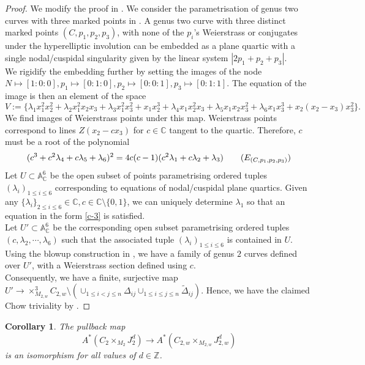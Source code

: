\documentclass[11pt]{amsart}
\newcommand\Z{\mathbb{Z}}
\numberwithin{theorem}{section}
\newtheorem{corollary}{Corollary}[section]
\numberwithin{lemma}{section}
\theoremstyle{definition}
\newcommand{\ri}{\rightarrow}
\newcommand{\K}{\mathbb{C}}
\newcommand{\la}{\lambda}
\begin{document}
\begin{proof}
	We modify the proof in \cite[Lemma 4.8]{shubham-r2}. We consider the parametrisation of genus two curves with three marked points in \cite[\S 2.4]{casnati}.
A genus two curve with three distinct marked points $(C,p_1,p_2,p_3)$, with none of the $p_i$’s Weierstrass or conjugates under the hyperelliptic involution can be embedded as a plane quartic with a single nodal/cuspidal singularity given by the linear system $|2p_1+p_2+p_3|$.\\
We rigidify the embedding further by setting the images of the node $N\mapsto  [1 : 0 : 0],p_1\mapsto [0 : 1 : 0],p_2\mapsto [0 : 0 : 1],p_3 \mapsto [0 : 1 : 1]$. 
The equation of the image is then an element of the space
$$V := \{\la_1x_1^2x_2^2+\la_2x_1^2x_2x_3+\la_3x_1^2x_3^2+x_1x_2^3+\la_4x_1x_2^2x_3+\la_5x_1x_2x_3^2+\la_6x_1x_3^3+ x_2(x_2-x_3)x_3^2\}.$$
 We find images of Weierstrass points under this map. Weierstrass points correspond to lines $Z(x_2-cx_3)$ for $c\in \K$ tangent to the quartic. Therefore, $c$ must be a root of the polynomial 
 \begin{equation}\label{c-3}(c^3+c^2\la_4+c\la_5+\la_6)^2 = 4c(c-1)(c^2\la_1+c\la_2+\la_3)\tag{$E_{(C,p_1,p_2,p_3)}$}\end{equation} 
Let $U\subset \mathbb{A}_\K^6$ be the open subset of points parametrising ordered tuples $(\la_i)_{1\leq i\leq 6}$ corresponding to equations of nodal/cuspidal plane quartics.
Given any $\{\la_i\}_{2\leq i\leq 6}\in \K,c\in \K\setminus\{0,1\}$, we can uniquely determine $\la_1$ so that an equation in the form \ref{c-3} is satisfied.\\
Let $U'\subset \mathbb{A}_\K^6$ be the corresponding open subset parametrising ordered tuples $(c,\la_2,\cdots,\la_6)$ such that the associated tuple $(\la_i)_{1\leq i\leq 6}$ is contained in $ U$.
Using the blowup construction in \cite[Lemma 3.4]{shubham-r2}, we have a family of genus $2$ curves defined over $U'$, with a Weierstrass section defined using $c$.\\
Consequently, we have a finite, surjective map $U'\ri \times_{M_{2,w}}^3C_{2,w}\setminus (\cup_{1\leq i<j\leq n}\Delta_{ij}\cup_{1\leq i\leq j\leq n}\tilde{\Delta}_{ij})$. Hence, we have the claimed Chow triviality by \cite[Remark 2.2]{vakil}.
\end{proof}
\begin{corollary}\label{cor:cj}
	The pullback map 
	$$A^*(C_2\times_{M_2}J^d_2)\ri A^*(C_{2,w}\times_{M_{2,w}}J^d_{2,w})$$
	is an isomorphism for all values of $d\in \Z$.
\end{corollary}
\end{document}
